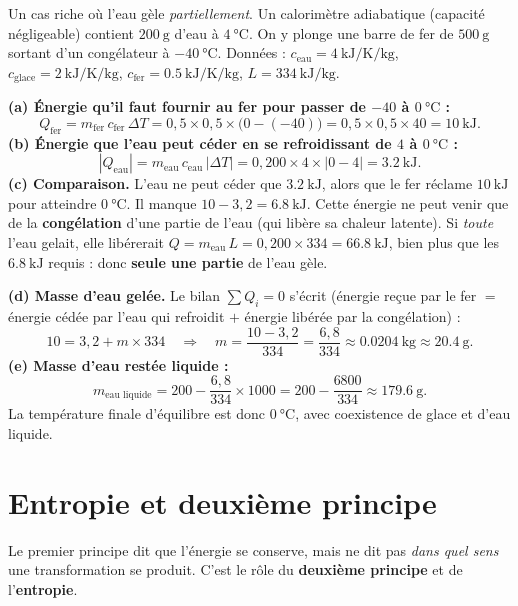 \documentclass[11pt,a4paper]{article}
\begin{document}
\begin{exemple}
Un cas riche où l'eau gèle \emph{partiellement}. Un calorimètre adiabatique (capacité négligeable)
contient $\SI{200}{\gram}$ d'eau à $\SI{4}{\celsius}$. On y plonge une barre de fer de $\SI{500}{\gram}$
sortant d'un congélateur à $\SI{-40}{\celsius}$. Données : $c_{\text{eau}} = \SI{4}{\kilo\joule\per\kelvin\per\kilogram}$,
$c_{\text{glace}} = \SI{2}{\kilo\joule\per\kelvin\per\kilogram}$, $c_{\text{fer}} = \SI{0.5}{\kilo\joule\per\kelvin\per\kilogram}$,
$L = \SI{334}{\kilo\joule\per\kilogram}$.

\textbf{(a) Énergie qu'il faut fournir au fer pour passer de $-40$ à $\SI{0}{\celsius}$ :}
\[ Q_{\text{fer}} = m_{\text{fer}}\,c_{\text{fer}}\,\Delta T = 0{,}5 \times 0{,}5 \times \big(0-(-40)\big)
   = 0{,}5\times0{,}5\times40 = \SI{10}{\kilo\joule}. \]
\textbf{(b) Énergie que l'eau peut céder en se refroidissant de $4$ à $\SI{0}{\celsius}$ :}
\[ |Q_{\text{eau}}| = m_{\text{eau}}\,c_{\text{eau}}\,|\Delta T| = 0{,}200 \times 4 \times |0-4|
   = \SI{3.2}{\kilo\joule}. \]
\textbf{(c) Comparaison.} L'eau ne peut céder que $\SI{3.2}{\kilo\joule}$, alors que le fer réclame
$\SI{10}{\kilo\joule}$ pour atteindre $\SI{0}{\celsius}$. Il manque $10 - 3{,}2 = \SI{6.8}{\kilo\joule}$.
Cette énergie ne peut venir que de la \textbf{congélation} d'une partie de l'eau (qui libère sa chaleur
latente). Si \emph{toute} l'eau gelait, elle libérerait
$Q = m_{\text{eau}}\,L = 0{,}200\times 334 = \SI{66.8}{\kilo\joule}$, bien plus que les
$\SI{6.8}{\kilo\joule}$ requis : donc \textbf{seule une partie} de l'eau gèle.

\textbf{(d) Masse d'eau gelée.} Le bilan $\sum Q_i = 0$ s'écrit (énergie reçue par le fer $=$ énergie
cédée par l'eau qui refroidit $+$ énergie libérée par la congélation) :
\[ 10 = 3{,}2 + m\times 334 \quad\Longrightarrow\quad
   m = \frac{10 - 3{,}2}{334} = \frac{6{,}8}{334} \approx \SI{0.0204}{\kilogram} \approx \SI{20.4}{\gram}. \]
\textbf{(e) Masse d'eau restée liquide :}
\[ m_{\text{eau liquide}} = 200 - \frac{6{,}8}{334}\times 1000 = 200 - \frac{6800}{334}
   \approx \SI{179.6}{\gram}. \]
La température finale d'équilibre est donc $\SI{0}{\celsius}$, avec coexistence de glace et d'eau liquide.
\end{exemple}

\section{Entropie et deuxième principe}
Le premier principe dit que l'énergie se conserve, mais ne dit pas \emph{dans quel sens} une
transformation se produit. C'est le rôle du \textbf{deuxième principe} et de l'\textbf{entropie}.
\end{document}
